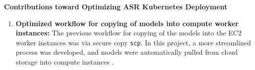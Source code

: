 \textbf{Contributions toward Optimizing ASR Kubernetes Deployment}
\vspace{-1em}
\begin{enumerate}[label=\alph*., itemsep=0pt]
    \item \textbf{Optimized workflow for copying of models into compute worker instances:} The previous workflow for copying of the models into the EC2 worker instances was via secure copy \texttt{scp}. In this project, a more streamlined process was developed, and models were automatically pulled from cloud storage into compute instances \cite{song-yu-2023}.  
\end{enumerate}
\newpage

